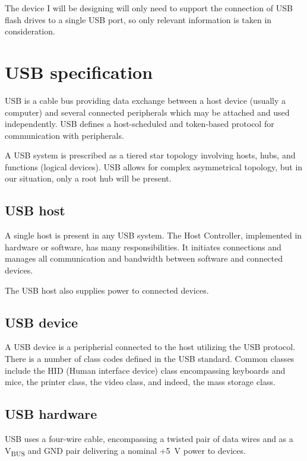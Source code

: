     The device I will be designing will only need to support the connection of USB flash drives to a single USB port, so only relevant information is taken in consideration.
    
    \section{USB specification}
        USB is a cable bus providing data exchange between a host device (usually a computer) and several connected peripherals which may be attached and used independently.  USB defines a host-scheduled and token-based protocol for communication with peripherals.
        
        A USB system is prescribed as a tiered star topology involving hosts, hubs, and functions (logical devices).  USB allows for complex asymmetrical topology, but in our situation, only a root hub will be present.
        
        \subsection{USB host}
            A single host is present in any USB system.  The Host Controller, implemented in hardware or software, has many responsibilities.  It initiates connections and manages all communication and bandwidth between software and connected devices.
            
            The USB host also supplies power to connected devices.
        
        \subsection{USB device}
            A USB device is a peripherial connected to the host utilizing the USB protocol.  There is a number of class codes defined in the USB standard\cite{usb-class-codes}.  Common classes include the HID (Human interface device) class encompassing keyboards and mice, the printer class, the video class, and indeed, the mass storage class. 
        
        \subsection{USB hardware}
            USB uses a four-wire cable, encompassing a twisted pair of data wires and as a V\textsubscript{BUS} and GND pair delivering a nominal +5~V power to devices.
            

